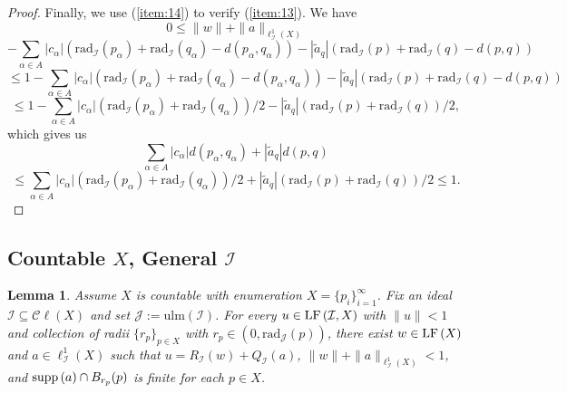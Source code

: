 \documentclass[12pt]{amsart}
\newtheorem{lemma}[theorem]{Lemma}
\theoremstyle{definition}
\numberwithin{equation}{section}
\def \I {\mathcal{I}}
\def \J {\mathcal{J}}
\def \sbs {\subseteq}
\newcommand{\Cl}[1]{\mathcal{C}\ell\left(#1\right)}
\renewcommand{\l}[2]{\ell^1_{#1}\left( #2 \right)}
\newcommand{\rad}[2]{\mathrm{rad}_{#1}\left(#2\right)}
\newcommand{\ulm}[1]{\mathrm{ulm}\left(#1\right)}
\begin{document}
\begin{proof}
Finally, we use (\ref{item:14}) to verify (\ref{item:13}). We have
$$0 \leq \|w\| + \|a\|_{\l{\I}{X}}$$
$$- \sum_{\alpha \in A} |c_\alpha|(\rad{\I}{p_\alpha}+\rad{\I}{q_\alpha}-d(p_\alpha,q_\alpha)) - |\tilde{a}_q|(\rad{\I}{p}+\rad{\I}{q}-d(p,q))$$
$$\leq 1 - \sum_{\alpha \in A} |c_\alpha|(\rad{\I}{p_\alpha}+\rad{\I}{q_\alpha}-d(p_\alpha,q_\alpha)) - |\tilde{a}_q|(\rad{\I}{p}+\rad{\I}{q}-d(p,q))$$
$$\leq 1 - \sum_{\alpha \in A} |c_\alpha|(\rad{\I}{p_\alpha}+\rad{\I}{q_\alpha})/2 - |\tilde{a}_q|(\rad{\I}{p}+\rad{\I}{q})/2,$$
which gives us
$$\sum_{\alpha \in A} |c_\alpha|d(p_\alpha,q_\alpha) + |\tilde{a}_q|d(p,q)$$
$$\leq \sum_{\alpha \in A} |c_\alpha|(\rad{\I}{p_\alpha}+\rad{\I}{q_\alpha})/2 + |\tilde{a}_q|(\rad{\I}{p}+\rad{\I}{q})/2 \leq 1.$$
\end{proof}

\subsection{Countable $X$, General $\I$}
\begin{lemma} \label{lem:quotientfinite}
Assume $X$ is countable with enumeration $X = \{p_i\}_{i=1}^\infty$. Fix an ideal $\I \sbs \Cl{X}$ and set $\J := \ulm{\I}$. For every $u \in \LF{\I}{X}$ with $\|u\| < 1$ and collection of radii $\{r_p\}_{p \in X}$ with $r_p \in (0,\rad{\J}{p})$, there exist $w \in \LF{X}$ and $a \in \l{\I}{X}$ such that $u = R_\I(w) + Q_\I(a)$, $\|w\| + \|a\|_{\l{\I}{X}} < 1$, and $\supp{a} \cap B_{r_p}(p)$ is finite for each $p \in X$.
\end{lemma}
\end{document}
